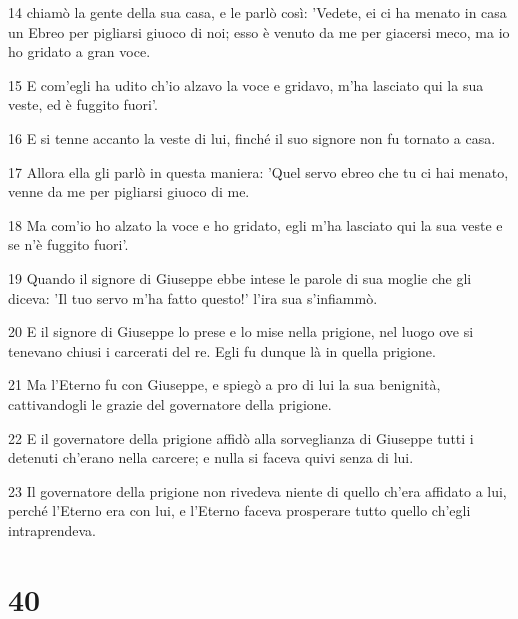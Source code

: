 \par 14 chiamò la gente della sua casa, e le parlò così: 'Vedete, ei ci ha menato in casa un Ebreo per pigliarsi giuoco di noi; esso è venuto da me per giacersi meco, ma io ho gridato a gran voce.
\par 15 E com'egli ha udito ch'io alzavo la voce e gridavo, m'ha lasciato qui la sua veste, ed è fuggito fuori'.
\par 16 E si tenne accanto la veste di lui, finché il suo signore non fu tornato a casa.
\par 17 Allora ella gli parlò in questa maniera: 'Quel servo ebreo che tu ci hai menato, venne da me per pigliarsi giuoco di me.
\par 18 Ma com'io ho alzato la voce e ho gridato, egli m'ha lasciato qui la sua veste e se n'è fuggito fuori'.
\par 19 Quando il signore di Giuseppe ebbe intese le parole di sua moglie che gli diceva: 'Il tuo servo m'ha fatto questo!' l'ira sua s'infiammò.
\par 20 E il signore di Giuseppe lo prese e lo mise nella prigione, nel luogo ove si tenevano chiusi i carcerati del re. Egli fu dunque là in quella prigione.
\par 21 Ma l'Eterno fu con Giuseppe, e spiegò a pro di lui la sua benignità, cattivandogli le grazie del governatore della prigione.
\par 22 E il governatore della prigione affidò alla sorveglianza di Giuseppe tutti i detenuti ch'erano nella carcere; e nulla si faceva quivi senza di lui.
\par 23 Il governatore della prigione non rivedeva niente di quello ch'era affidato a lui, perché l'Eterno era con lui, e l'Eterno faceva prosperare tutto quello ch'egli intraprendeva.

\chapter{40}

